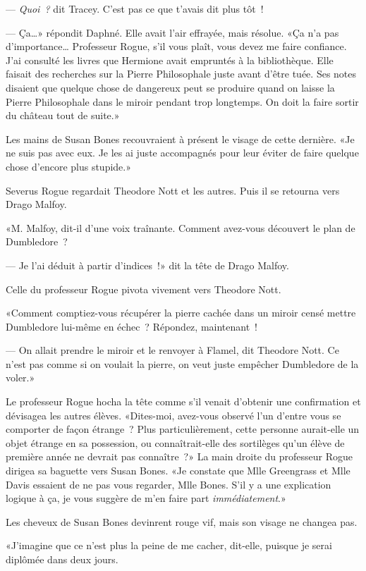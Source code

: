 --- \emph{Quoi~?} dit Tracey. C'est pas ce que t'avais dit plus tôt~!

--- Ça…» répondit Daphné. Elle avait l'air effrayée, mais résolue. «Ça n'a pas d'importance… Professeur Rogue, s'il vous plaît, vous devez me faire confiance. J'ai consulté les livres que Hermione avait empruntés à la bibliothèque. Elle faisait des recherches sur la Pierre Philosophale juste avant d'être tuée. Ses notes disaient que quelque chose de dangereux peut se produire quand on laisse la Pierre Philosophale dans le miroir pendant trop longtemps. On doit la faire sortir du château tout de suite.»

Les mains de Susan Bones recouvraient à présent le visage de cette dernière. «Je ne suis pas avec eux. Je les ai juste accompagnés pour leur éviter de faire quelque chose d'encore plus stupide.»

Severus Rogue regardait Theodore Nott et les autres. Puis il se retourna vers Drago Malfoy.

«M. Malfoy, dit-il d'une voix traînante. Comment avez-vous découvert le plan de Dumbledore~?

--- Je l'ai déduit à partir d'indices~!» dit la tête de Drago Malfoy.

Celle du professeur Rogue pivota vivement vers Theodore Nott.

«Comment comptiez-vous récupérer la pierre cachée dans un miroir censé mettre Dumbledore lui-même en échec~? Répondez, maintenant~!

--- On allait prendre le miroir et le renvoyer à Flamel, dit Theodore Nott. Ce n'est pas comme si on voulait la pierre, on veut juste empêcher Dumbledore de la voler.»

Le professeur Rogue hocha la tête comme s'il venait d'obtenir une confirmation et dévisagea les autres élèves. «Dites-moi, avez-vous observé l'un d'entre vous se comporter de façon étrange~? Plus particulièrement, cette personne aurait-elle un objet étrange en sa possession, ou connaîtrait-elle des sortilèges qu'un élève de première année ne devrait pas connaître~?» La main droite du professeur Rogue dirigea sa baguette vers Susan Bones. «Je constate que Mlle Greengrass et Mlle Davis essaient de ne pas vous regarder, Mlle Bones. S'il y a une explication logique à ça, je vous suggère de m'en faire part \emph{immédiatement}.»

Les cheveux de Susan Bones devinrent rouge vif, mais son visage ne changea pas.

«J'imagine que ce n'est plus la peine de me cacher, dit-elle, puisque je serai diplômée dans deux jours.

